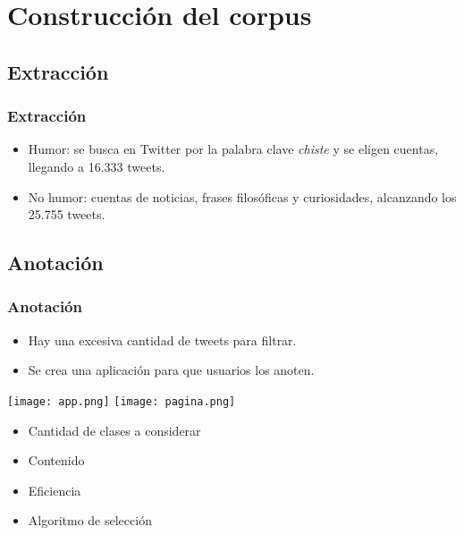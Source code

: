 \section{Construcción del corpus}

\subsection{Extracción}
\begin{frame}
    \frametitle{Extracción}

    \begin{itemize}
        \item Humor: se busca en Twitter por la palabra clave \emph{chiste} y se eligen cuentas, llegando a 16.333 tweets.
        \item No humor: cuentas de noticias, frases filosóficas y curiosidades, alcanzando los 25.755 tweets.
    \end{itemize}
\end{frame}

\subsection{Anotación}
\begin{frame}[allowframebreaks]
    \frametitle{Anotación}

    \begin{itemize}
        \item Hay una excesiva cantidad de tweets para filtrar.
        \item Se crea una aplicación para que usuarios los anoten.
    \end{itemize}

    \framebreak

    \begin{center}
        \texttt{[image: app.png]}
        \hspace{1cm}
        \texttt{[image: pagina.png]}
    \end{center}

    \framebreak

    \begin{itemize}
        \item Cantidad de clases a considerar
        \item Contenido
        \item Eficiencia
        \item Algoritmo de selección
    \end{itemize}
\end{frame}
